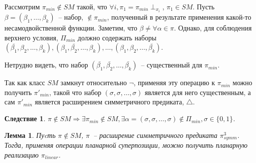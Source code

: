 \documentclass[12pt]{article}
\newtheorem{lemma}[theorem]{Лемма}
\newtheorem{corollary}[theorem]{Следствие}
\newenvironment{proof}[1][Доказательство]{\begin{trivlist}
\item[\hskip \labelsep {\bfseries #1}]}{\end{trivlist}}
\begin{document}
\begin{proof}
Рассмотрим $\pi_{min} \notin SM$ такой, что $\forall i, \pi_1 = \pi_{min} \perp_{x_i}$,
$\pi_1 \in SM$.
Пусть $\beta = (\beta_1, \dots, \beta_k)$~-- набор, $\notin \pi_{min}$, полученный в результате применения какой-то несамодвойственной функции.
Заметим, что $\beta \neq \forall \alpha \in \pi$. Однако, для соблюдения верхнего условия,
$\Pi_{min}$ должно содержать наборы 
$(\bar{\beta_1}, \beta_2, \dots, \beta_k), (\beta_1, \bar{\beta_2}, \dots, \beta_k), \dots, (\beta_1, \beta_2, \dots, \bar{\beta_k})$.

Нетрудно видеть, что набор $(\bar{\beta_1}, \bar{\beta_2}, \dots, \bar{\beta_k})$~-- существенный для $\pi_{min}$.

Так как класс $SM$ замкнут относительно $\neg$, применяя эту операцию к $\pi_{min}$ можно получить $\pi'_{min}$,
такой что набор $(\sigma, \sigma, \dots, \sigma)$ является для него существенным, а сам $\pi'_{min}$ является расширением 
симметричного предиката, $\bigtriangleup$.
\end{proof}

\begin{corollary}
\label{lemma_sm_corollary}
$\pi \notin SM \Longrightarrow \exists \pi_{min} \notin SM, \exists 
\alpha = (\sigma, \sigma, \dots, \sigma) \notin \Pi_{min}, \sigma \in \{0, 1\}$.
\end{corollary}

\begin{lemma}
\label{eq:super_new}
Пуcть $\pi \notin SM$, $\pi$~-- расширение симметричного предиката $\pi_{symm}^3$. 
Тогда, применяя операции планарной суперпозиции, можно получить планарную реализацию $\pi_{linear}$.
\end{lemma}
\end{document}
